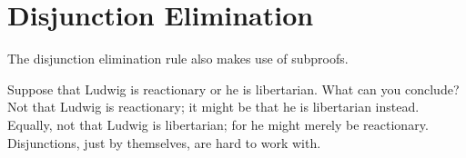 %
%
%


\section{Disjunction Elimination}\label{s:orE}
The disjunction elimination rule also makes use of subproofs.

Suppose that  Ludwig is reactionary or he is libertarian. What can you conclude? Not that Ludwig is reactionary; it might be that he is libertarian instead. Equally, not that Ludwig is libertarian; for he might merely be reactionary. Disjunctions, just by themselves, are hard to work with. 


